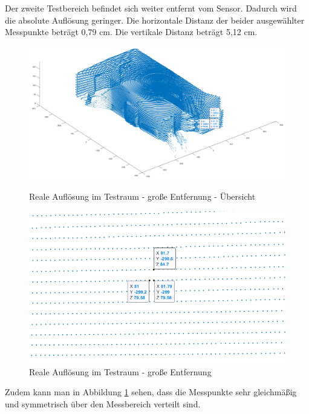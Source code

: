 Der zweite Testbereich befindet sich weiter entfernt vom Sensor. Dadurch wird die absolute Auflösung geringer.
Die horizontale Distanz der beider ausgewählter Messpunkte beträgt 0,79 cm. Die vertikale Distanz beträgt 5,12 cm.  

\begin{figure}[htb]
	\centering
	\begin{minipage}[t]{0.45\linewidth}
		\centering
		\includegraphics[width=1.2\linewidth]{images/Validierung/Aufloesungen/3Messwerte_Wand.png}
		\caption{Reale Auflösung im Testraum - große Entfernung - Übersicht}
		\label{realeAuslösung2_Übersicht}
	\end{minipage}
	\hfill
	\begin{minipage}[t]{0.45\linewidth}
		\centering
		\includegraphics[width=1.2\linewidth]{images/Validierung/Aufloesungen/Wand_3Messungen.png}
		\caption{Reale Auflösung im Testraum - große Entfernung}
		\label{realeAuslösung2}
	\end{minipage}
\end{figure}


Zudem kann man in Abbildung \ref{realeAuslösung2} sehen, dass die Messpunkte sehr gleichmäßig und symmetrisch über den Messbereich verteilt sind. 


